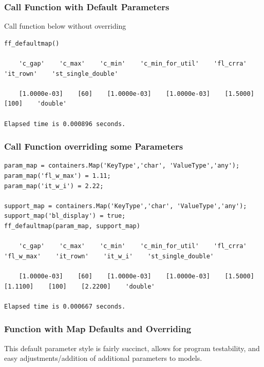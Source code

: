 \documentclass[
]{book}
\begin{document}
\hypertarget{call-function-with-default-parameters}{%
\subsubsection{Call Function with Default Parameters}\label{call-function-with-default-parameters}}

Call function below without overriding

\begin{verbatim}
ff_defaultmap()

    'c_gap'    'c_max'    'c_min'    'c_min_for_util'    'fl_crra'    'it_rown'    'st_single_double'

    [1.0000e-03]    [60]    [1.0000e-03]    [1.0000e-03]    [1.5000]    [100]    'double'

Elapsed time is 0.000896 seconds.
\end{verbatim}

\hypertarget{call-function-overriding-some-parameters}{%
\subsubsection{Call Function overriding some Parameters}\label{call-function-overriding-some-parameters}}

\begin{verbatim}
param_map = containers.Map('KeyType','char', 'ValueType','any');
param_map('fl_w_max') = 1.11;
param_map('it_w_i') = 2.22;

support_map = containers.Map('KeyType','char', 'ValueType','any');
support_map('bl_display') = true;
ff_defaultmap(param_map, support_map)

    'c_gap'    'c_max'    'c_min'    'c_min_for_util'    'fl_crra'    'fl_w_max'    'it_rown'    'it_w_i'    'st_single_double'

    [1.0000e-03]    [60]    [1.0000e-03]    [1.0000e-03]    [1.5000]    [1.1100]    [100]    [2.2200]    'double'

Elapsed time is 0.000667 seconds.
\end{verbatim}

\hypertarget{function-with-map-defaults-and-overriding}{%
\subsubsection{Function with Map Defaults and Overriding}\label{function-with-map-defaults-and-overriding}}

This default parameter style is fairly succinct, allows for program
testability, and easy adjustments/addition of additional parameters to
models.
\end{document}
